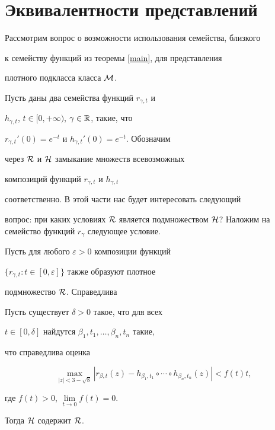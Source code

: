\section{Эквивалентности представлений}





Рассмотрим вопрос о возможности использования семейства, близкого


к семейству функций из теоремы \ref{main}, для представления


плотного подкласса класса $\cal M$.





Пусть даны два семейства функций $r_{\gamma,t}$ и


$h_{\gamma,t}$, $t\in[0,+\infty)$, $\gamma\in\Bbb R$, такие, что


$r_{\gamma,t}'(0)=e^{-t}$ и $h_{\gamma,t}'(0)=e^{-t}$. Обозначим


через $\cal R$ и $\cal H$ замыкание множеств всевозможных


композиций функций $r_{\gamma,t}$ и $h_{\gamma,t}$


соответственно. В этой части нас будет интересовать следующий


вопрос: при каких условиях $\cal R$ является подмножеством $\cal


H$? Наложим на семейство функций $r_{\gamma}$ следующее условие.


Пусть для любого $\varepsilon>0$ композиции функций


$\{r_{\gamma,t}:t\in[0,\varepsilon]\}$ также образуют плотное


подмножество $\cal R$. Справедлива





\begin{thm}\label{equalint}


Пусть существует $\delta>0$ такое, что для всех


$t\in[0,\delta]$ найдутся $\beta_1,t_1,\dotsc, \beta_n,t_n$ такие,


что справедлива оценка


\begin{equation}


\max\limits_{|z|<3-\sqrt8}|r_{\beta,t}(z)-h_{\beta_1,t_1}\circ\dotsb\circ


h_{\beta_n,t_n}(z)|<f(t)t,


\end{equation}


где $f(t)>0$, $\lim\limits_{t\to0}f(t)=0$.


Тогда $\cal H$ содержит $\cal R$.


\end{thm}





